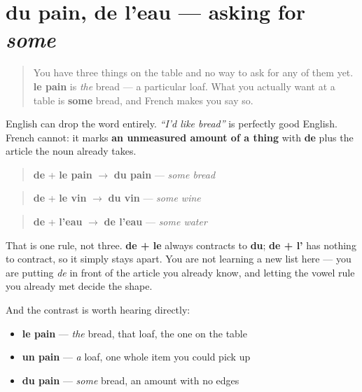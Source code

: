 \section[du pain, de l'eau]{du pain, de l'eau — asking for \emph{some}}

\label{lesson:FR-C11-du}



\begin{quote}
You have three things on the table and no way to ask for any of them yet. \textbf{le pain} is \emph{the} bread — a particular loaf. What you actually want at a table is \textbf{some} bread, and French makes you say so.
\end{quote}

\begin{grammarlens}[title={Grammar Lens: French says \textquotedblleft{}of the\textquotedblright{}, where English says nothing}]
English can drop the word entirely. \emph{\textquotedblleft{}I'd like bread\textquotedblright{}} is perfectly good English. French cannot: it marks \textbf{an unmeasured amount of a thing} with \textbf{de} plus the article the noun already takes.

\begin{quote}
\textbf{de} + \textbf{le pain} $\to$ \textbf{du pain} — \emph{some bread}
\end{quote}

\begin{quote}
\textbf{de} + \textbf{le vin} $\to$ \textbf{du vin} — \emph{some wine}
\end{quote}

\begin{quote}
\textbf{de} + \textbf{l'eau} $\to$ \textbf{de l'eau} — \emph{some water}
\end{quote}

That is one rule, not three. \textbf{de + le} always contracts to \textbf{du}; \textbf{de + l'} has nothing to contract, so it simply stays apart. You are not learning a new list here — you are putting \emph{de} in front of the article you already know, and letting the vowel rule you already met decide the shape.

And the contrast is worth hearing directly:

\begin{itemize}
\raggedright
  \item \textbf{le pain} — \emph{the} bread, that loaf, the one on the table
  \item \textbf{un pain} — \emph{a} loaf, one whole item you could pick up
  \item \textbf{du pain} — \emph{some} bread, an amount with no edges
\end{itemize}
\end{grammarlens}

